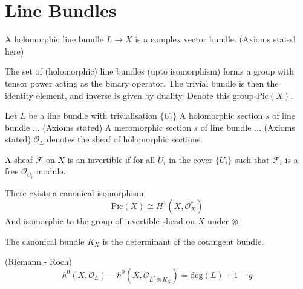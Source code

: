 
\section{Line Bundles} %

\begin{definition}
A holomorphic line bundle $ L \rightarrow  X$ is a complex vector bundle. 
    (Axioms stated here)
\end{definition}

The set of (holomorphic) line bundles (upto isomorphism) forms a group with tensor power acting as the binary operator.
The trivial bundle is then the identity element, and inverse is given by duality.
Denote this group $ \mathrm{Pic}(X) $. 

\begin{definition}
    Let $L$ be a line bundle with trivialisation $\{ U_i \} $ 
    A holomorphic section $s$ of line bundle ... (Axioms stated)
    A meromorphic section $s$ of line bundle ... (Axioms stated)
    $\mathcal{O}_L $ denotes the sheaf of holomorphic sections. 
\end{definition}

\begin{definition}
    A sheaf $ \mathcal{F} $ on $ X$ is an invertible if for all $U_i$  in the cover $\{U_i\} $ 
    such that $ \mathcal{F}_i$ is a free $\mathcal{O}_{U_i} $ module. 
\end{definition}

\begin{theorem}
    There exists a canonical isomorphism 
    \begin{equation}
        \mathrm{Pic} (X)  \cong H^1 ( X, \mathcal{O}^* _ X ) 
    \end{equation}
    And isomorphic to the group of invertible shead on $X$ under $ \otimes$. 
\end{theorem}

\begin{definition}
    The canonical bundle $ K_X $ is the determinant of the cotangent bundle. 
\end{definition}

\begin{theorem}
    (Riemann - Roch) 
    \begin{equation}
        h^0 (X, \mathcal{O} _L) - h^0 (X, \mathcal{O}_{L^* \otimes K_X}) = \mathrm{deg} (L) + 1 - g 
    \end{equation}
\end{theorem}

